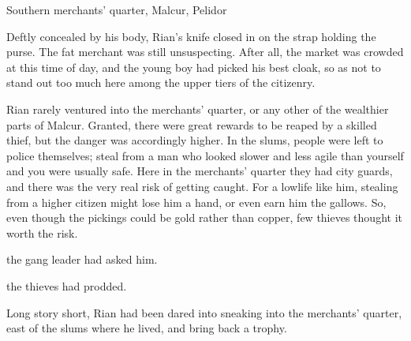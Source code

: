 

\begin{comment}
\section{New Version}
\end{comment}

\stamp
  {\dateIshnaruchaefirSlaysAGhobal}
  {Southern merchants' quarter, Malcur, Pelidor}
  


\begin{comment}
  \subsection{Rian sees them}
\end{comment}
\new
{}

Deftly concealed by his body, Rian's knife closed in on the strap holding the purse. The fat merchant was still unsuspecting. After all, the market was crowded at this time of day, and the young boy had picked his best cloak, so as not to stand out too much here among the upper tiers of the citizenry. 

Rian rarely ventured into the merchants' quarter, or any other of the wealthier parts of Malcur. Granted, there were great rewards to be reaped by a skilled thief, but the danger was accordingly higher. In the slums, people were left to police themselves; steal from a man who looked slower and less agile than yourself and you were usually safe. Here in the merchants' quarter they had city guards, and there was the very real risk of getting caught. For a lowlife like him, stealing from a higher citizen might lose him a hand, or even earn him the gallows. So, even though the pickings could be gold rather than copper, few thieves thought it worth the risk.

 the gang leader had asked him. 

 the thieves had prodded. 


Long story short, Rian had been dared into sneaking into the merchants' quarter, east of the slums where he lived, and bring back a trophy. 


